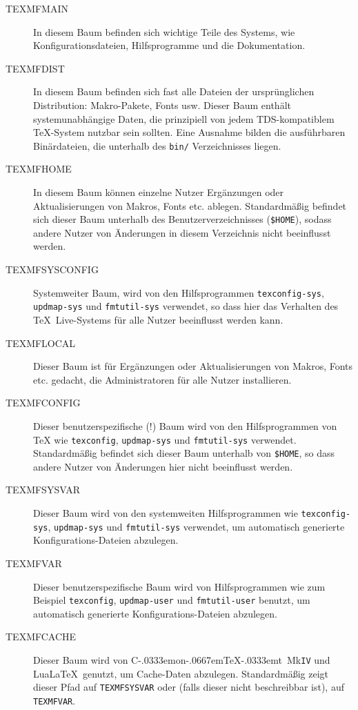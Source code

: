 \documentclass[12pt,ngerman,a4paper,fullparskip]{scrreprt}
\newcommand{\TL}{\TeX\ Live\xspace}
\newcommand{\acro}[1]{\texttt{#1}}
\newcommand{\code}[1]{\texttt{#1}}
\newcommand\ConTeXt{C\kern-.0333emon\-\kern-.0667em\TeX\kern-.0333emt}
\begin{document}
\begin{description}
\item [TEXMFMAIN] In diesem Baum befinden sich wichtige Teile des Systems,
  wie Konfigurationsdateien, Hilfsprogramme und die Dokumentation.
\item [TEXMFDIST] In diesem Baum befinden sich fast alle Dateien der ursprünglichen Distribution: Makro-Pakete, Fonts usw. Dieser Baum enthält systemunabhängige Daten, die prinzipiell
  von jedem TDS-kompatiblem \TeX-System nutzbar sein sollten. Eine Ausnahme bilden die ausführbaren Binärdateien, die unterhalb des \code{bin/} Verzeichnisses liegen. 
\item [TEXMFHOME] In diesem Baum können einzelne Nutzer Ergänzungen oder
  Aktualisierungen von Makros, Fonts etc. ablegen. Standardmäßig befindet
  sich dieser Baum unterhalb des Benutzerverzeichnisses (\verb+$HOME+), sodass andere Nutzer von Änderungen in diesem Verzeichnis nicht beeinflusst werden.
\item [TEXMFSYSCONFIG] Systemweiter Baum, wird von den Hilfsprogrammen
  \verb+texconfig-sys+, \verb+updmap-sys+ und \verb+fmtutil-sys+
  verwendet, so dass hier das Verhalten des \TL-Systems für alle Nutzer
  beeinflusst werden kann.
\item [TEXMFLOCAL] Dieser Baum ist für Ergänzungen oder Aktualisierungen
  von Makros, Fonts etc. gedacht, die Administratoren für alle Nutzer
  installieren.
\item [TEXMFCONFIG] Dieser benutzerspezifische (!) Baum wird von den Hilfsprogrammen von \TeX{}
  wie \verb+texconfig+, \verb+updmap-sys+ und \verb+fmtutil-sys+ verwendet.
  Standardmäßig befindet sich dieser Baum unterhalb von \verb+$HOME+,
  so dass andere Nutzer von Änderungen hier nicht beeinflusst werden.
\item [TEXMFSYSVAR] Dieser Baum wird von den systemweiten Hilfsprogrammen
  wie \verb+texconfig-sys+, \verb+updmap-sys+ und \verb+fmtutil-sys+
  verwendet, um automatisch generierte Konfigurations-Dateien abzulegen.
\item [TEXMFVAR] Dieser benutzerspezifische Baum wird von Hilfsprogrammen wie zum Beispiel \verb+texconfig+,
  \verb+updmap-user+ und \verb+fmtutil-user+ benutzt, um automatisch generierte
  Konfigurations-Dateien abzulegen.
\item [TEXMFCACHE] Dieser Baum wird von \ConTeXt\ Mk\acro{IV} und Lua\LaTeX\ genutzt, um Cache-Daten abzulegen. Standardmäßig zeigt dieser Pfad auf \code{TEXMFSYSVAR} oder (falls dieser nicht beschreibbar ist), auf \code{TEXMFVAR}.
\end{description}
\end{document}
